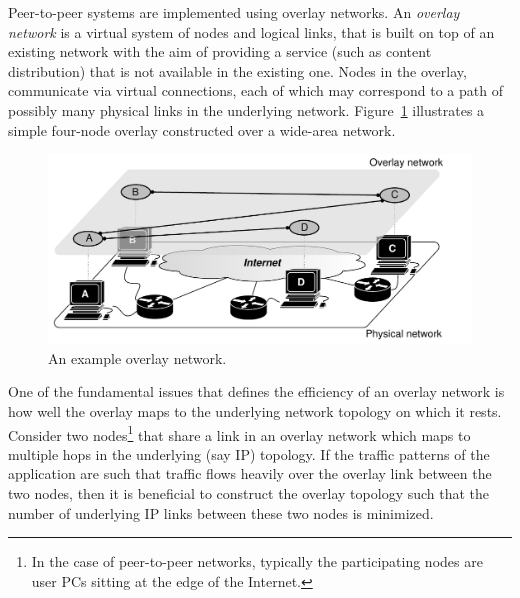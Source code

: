 Peer-to-peer systems are implemented using overlay networks. An \emph{overlay
network} is a virtual system of nodes and logical links, that is built on top of
an existing network with the aim of providing a service (such as content
distribution) that is not available in the existing one. Nodes in the overlay,
communicate via virtual connections, each of which may correspond to a path of
possibly many physical links in the underlying network.
Figure~\ref{figure:overlay} illustrates a simple four-node overlay constructed
over a wide-area network.

\begin{figure}
\centering
  \includegraphics[scale=0.7]{img/pdf/under-over-lay.pdf}
\caption{An example overlay network.}
\label{figure:overlay}
\end{figure}

One of the fundamental issues that defines the efficiency of an overlay network
is how well the overlay maps to the underlying network topology on which it
rests. Consider two nodes\footnote{In the case of peer-to-peer networks,
typically the participating nodes are user PCs sitting at the edge of the
Internet.} that share a link in an overlay network which maps to multiple hops
in the underlying (say IP) topology. If the traffic patterns of the application
are such that traffic flows heavily over the overlay link between the two nodes,
then it is beneficial to construct the overlay topology such that the number of
underlying IP links between these two nodes is minimized.

